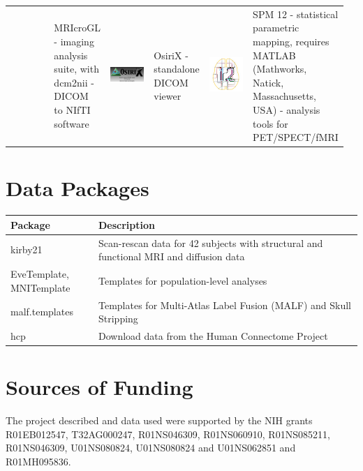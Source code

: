 \documentclass[final]{beamer}\usepackage[]{graphicx}\usepackage[]{color}
\begin{document}
\begin{frame}[fragile]
\begin{table}[!htb]
\begin{minipage}{0.40\linewidth}
\begin{tabular}{>{\centering}m{0.16\linewidth}>{\centering}m{0.16\linewidth}|>{\centering}m{0.16\linewidth}>{\centering}m{0.16\linewidth}|>{\centering}m{0.16\linewidth}>{\centering\arraybackslash}m{0.16\linewidth}}
& MRIcroGL - imaging analysis suite, with dcm2nii - DICOM to NIfTI software
& \includegraphics[clip, width=5cm, keepaspectratio]{figures/OsiriX.png}
& OsiriX - standalone DICOM viewer  
& \includegraphics[clip, width=5cm, keepaspectratio]{figures/spm12.png} & SPM 12 - statistical parametric mapping, requires MATLAB (Mathworks, Natick, Massachusetts, USA) - analysis tools for PET/SPECT/fMRI
\end{tabular}

\section{Data Packages}
\begin{table}[h]
\centering
\begin{tabular}{m{0.25\linewidth}>{\centering \arraybackslash}m{0.75\linewidth}}
Package & Description \\ \hline
kirby21 & Scan-rescan data for 42 subjects with structural and functional MRI and diffusion data \citep{kirby} \\
EveTemplate, MNITemplate & Templates for population-level analyses \citep{eve, fonov2011unbiased, fonov2009unbiased}   \\
malf.templates & Templates \citep{bennett2012miccai} for Multi-Atlas Label Fusion (MALF) and Skull Stripping \\
hcp &  Download data from the Human Connectome Project	\citep{hcp}
\end{tabular}
\end{table}


\section{Sources of Funding}
{\scriptsize
The project described and data used were supported by the NIH grants R01EB012547, T32AG000247, R01NS046309, R01NS060910, R01NS085211, R01NS046309, U01NS080824, U01NS080824 and U01NS062851 and R01MH095836.
}




\end{minipage}
\end{table}
\end{frame}
\end{document}
